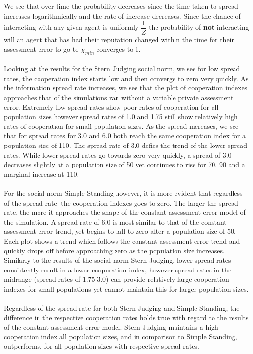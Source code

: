 \documentclass[10pt,a4paper]{article}
\begin{document}
We see that over time the probability decreases since the time taken to spread increases logarithmically and the rate of increase decreases.
Since the chance of interacting with any given agent is uniformly $\dfrac{1}{Z}$ the probability of \textbf{not} interacting will an agent that has had their reputation changed within the time for their assessment error to go to $\chi_{min}$ converges to 1.
\\\\
Looking at the results for the Stern Judging social norm, we see for low spread rates, the cooperation index starts low and then converge to zero very quickly.
As the information spread rate increases, we see that the plot of cooperation indexes approaches that of the simulations ran without a variable private assessment error.
Extremely low spread rates show poor rates of cooperation for all population sizes however spread rates of 1.0 and 1.75 still show relatively high rates of cooperation for small population sizes.
As the spread increases, we see that for spread rates for 3.0 and 6.0 both reach the same cooperation index for a population size of 110.
The spread rate of 3.0 defies the trend of the lower spread rates.
While lower spread rates go towards zero very quickly, a spread of 3.0 decreases slightly at a population size of 50 yet continues to rise for 70, 90 and a marginal increase at 110.
\\\\
For the social norm Simple Standing however, it is more evident that regardless of the spread rate, the cooperation indexes goes to zero.
The larger the spread rate, the more it approaches the shape of the constant assessment error model of the simulation.
A spread rate of 6.0 is most similar to that of the constant assessment error trend, yet begins to fall to zero after a population size of 50.
Each plot shows a trend which follows the constant assessment error trend and quickly drops off before approaching zero as the population size increases. 
Similarly to the results of the social norm Stern Judging, lower spread rates consistently result in a lower cooperation index, however spread rates in the midrange (spread rates of 1.75-3.0) can provide relatively large cooperation indexes for small populations yet cannot maintain this for larger population sizes.
\\\\
Regardless of the spread rate for both Stern Judging and Simple Standing, the difference in the respective cooperation rates holds true with regard to the results of the constant assessment error model.
Stern Judging maintains a high cooperation index all population sizes, and in comparison to Simple Standing, outperforms, for all population sizes with respective spread rates.
\end{document}
